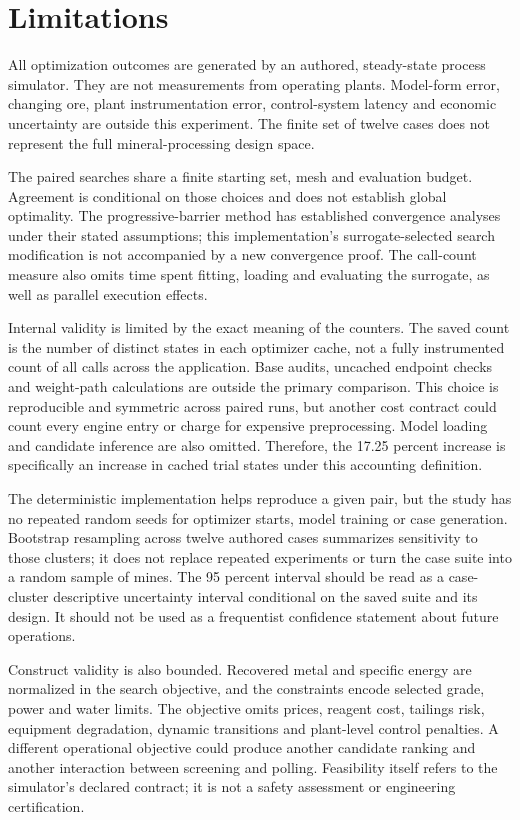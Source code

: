 \documentclass[10pt]{article}
\begin{document}
\section{Limitations}
All optimization outcomes are generated by an authored, steady-state process simulator. They are not measurements from operating plants. Model-form error, changing ore, plant instrumentation error, control-system latency and economic uncertainty are outside this experiment. The finite set of twelve cases does not represent the full mineral-processing design space.

The paired searches share a finite starting set, mesh and evaluation budget. Agreement is conditional on those choices and does not establish global optimality. The progressive-barrier method has established convergence analyses under their stated assumptions; this implementation's surrogate-selected search modification is not accompanied by a new convergence proof. The call-count measure also omits time spent fitting, loading and evaluating the surrogate, as well as parallel execution effects.

Internal validity is limited by the exact meaning of the counters. The saved count is the number of distinct states in each optimizer cache, not a fully instrumented count of all calls across the application. Base audits, uncached endpoint checks and weight-path calculations are outside the primary comparison. This choice is reproducible and symmetric across paired runs, but another cost contract could count every engine entry or charge for expensive preprocessing. Model loading and candidate inference are also omitted. Therefore, the 17.25 percent increase is specifically an increase in cached trial states under this accounting definition.

The deterministic implementation helps reproduce a given pair, but the study has no repeated random seeds for optimizer starts, model training or case generation. Bootstrap resampling across twelve authored cases summarizes sensitivity to those clusters; it does not replace repeated experiments or turn the case suite into a random sample of mines. The 95 percent interval should be read as a case-cluster descriptive uncertainty interval conditional on the saved suite and its design. It should not be used as a frequentist confidence statement about future operations.

Construct validity is also bounded. Recovered metal and specific energy are normalized in the search objective, and the constraints encode selected grade, power and water limits. The objective omits prices, reagent cost, tailings risk, equipment degradation, dynamic transitions and plant-level control penalties. A different operational objective could produce another candidate ranking and another interaction between screening and polling. Feasibility itself refers to the simulator's declared contract; it is not a safety assessment or engineering certification.
\end{document}
